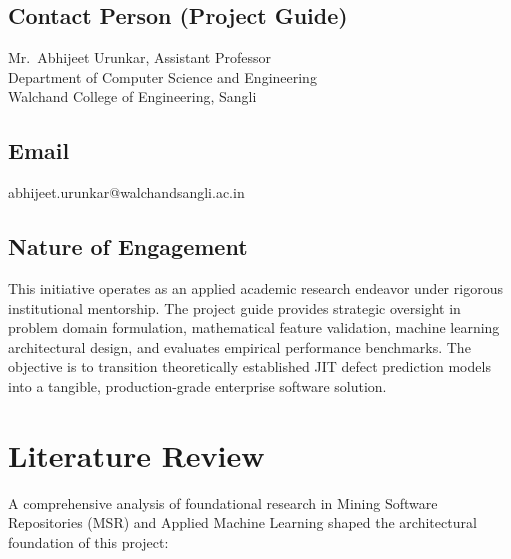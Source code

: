 \documentclass[12pt, a4paper]{article}
\begin{document}
\subsection{Contact Person (Project Guide)}
Mr.\ Abhijeet Urunkar, Assistant Professor\\
Department of Computer Science and Engineering\\
Walchand College of Engineering, Sangli

\subsection{Email}
abhijeet.urunkar@walchandsangli.ac.in

\subsection{Nature of Engagement}
This initiative operates as an applied academic research endeavor under rigorous institutional mentorship. The project guide provides strategic oversight in problem domain formulation, mathematical feature validation, machine learning architectural design, and evaluates empirical performance benchmarks. The objective is to transition theoretically established JIT defect prediction models into a tangible, production-grade enterprise software solution.

\clearpage
\section{Literature Review}

A comprehensive analysis of foundational research in Mining Software Repositories (MSR) and Applied Machine Learning shaped the architectural foundation of this project:
\end{document}
